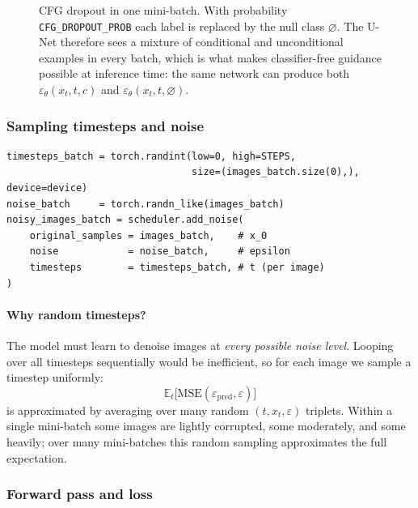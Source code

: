 \documentclass[11pt]{article}
\newcommand{\code}[1]{\texttt{#1}}
\newcommand{\xT}{x_t}
\newcommand{\eps}{\varepsilon}
\begin{document}
\begin{figure}[!htbp]
{%
}
\caption{CFG dropout in one mini-batch. With probability
\code{CFG\_DROPOUT\_PROB} each label is replaced by the null class
$\varnothing$. The U-Net therefore sees a mixture of conditional and
unconditional examples in every batch, which is what makes
classifier-free guidance possible at inference time: the same network can
produce both $\eps_\theta(\xT, t, c)$ and $\eps_\theta(\xT, t, \varnothing)$.}
\label{fig:cfg-dropout}
\end{figure}

\FloatBarrier

\subsubsection{Sampling timesteps and noise}

\begin{lstlisting}
timesteps_batch = torch.randint(low=0, high=STEPS,
                                size=(images_batch.size(0),), device=device)
noise_batch     = torch.randn_like(images_batch)
noisy_images_batch = scheduler.add_noise(
    original_samples = images_batch,    # x_0
    noise            = noise_batch,     # epsilon
    timesteps        = timesteps_batch, # t (per image)
)
\end{lstlisting}

\paragraph{Why random timesteps?} The model must learn to denoise images at
\emph{every possible noise level}. Looping over all timesteps sequentially
would be inefficient, so for each image we sample a timestep uniformly:
\[
  \mathbb{E}_t\bigl[\mathrm{MSE}(\eps_{\text{pred}}, \eps)\bigr]
\]
is approximated by averaging over many random $(t, \xT, \eps)$ triplets.
Within a single mini-batch some images are lightly corrupted, some
moderately, and some heavily; over many mini-batches this random sampling
approximates the full expectation.

\subsubsection{Forward pass and loss}
\end{document}

